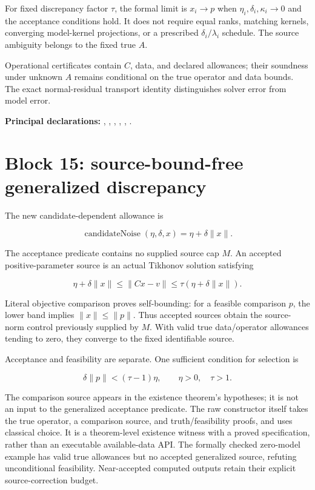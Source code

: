 \documentclass[11pt]{article}
\begin{document}
For fixed discrepancy factor \(\tau\), the formal limit is \(x_i\to p\)
when \(\eta_i,\delta_i,\kappa_i\to0\) and the acceptance conditions
hold. It does not require equal ranks, matching kernels, converging
model-kernel projections, or a prescribed \(\delta_i/\lambda_i\)
schedule. The source ambiguity belongs to the fixed true \(A\).

Operational certificates contain \(C\), data, and declared allowances;
their soundness under unknown \(A\) remains conditional on the true
operator and data bounds. The exact normal-residual transport identity
distinguishes solver error from model error.

\textbf{Principal declarations:}
\texttt{},
\texttt{},
\texttt{},
\texttt{},
\texttt{},
\texttt{}.

\hypertarget{block-15-source-bound-free-generalized-discrepancy}{%
\section{Block 15: source-bound-free generalized
discrepancy}\label{block-15-source-bound-free-generalized-discrepancy}}

The new candidate-dependent allowance is

\[
\operatorname{candidateNoise}(\eta,\delta,x)=\eta+\delta\|x\|.
\]

The acceptance predicate contains no supplied source cap \(M\). An
accepted positive-parameter source is an actual Tikhonov solution
satisfying

\[
\eta+\delta\|x\|\le\|Cx-v\|\le\tau(\eta+\delta\|x\|).
\]

Literal objective comparison proves self-bounding: for a feasible
comparison \(p\), the lower band implies \(\|x\|\le\|p\|\). Thus
accepted sources obtain the source-norm control previously supplied by
\(M\). With valid true data/operator allowances tending to zero, they
converge to the fixed identifiable source.

Acceptance and feasibility are separate. One sufficient condition for
selection is

\[
\delta\|p\|<(\tau-1)\eta,\qquad \eta>0,\quad\tau>1.
\]

The comparison source appears in the existence theorem's hypotheses; it
is not an input to the generalized acceptance predicate. The raw
\texttt{}
constructor itself takes the true operator, a comparison source, and
truth/feasibility proofs, and uses classical choice. It is a
theorem-level existence witness with a proved specification, rather than
an executable available-data API. The formally checked zero-model
example has valid true allowances but no accepted generalized source,
refuting unconditional feasibility. Near-accepted computed outputs
retain their explicit source-correction budget.
\end{document}
